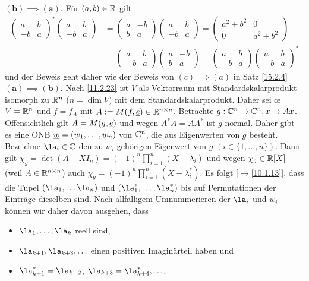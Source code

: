\documentclass[../../main.tex]{subfiles}
\begin{document}
\begin{cproof}
$\boldsymbol{(b)\implies (a)}$. Für $(a,b)\in \mathbb R$ gilt
\begin{align*}
\begin{pmatrix*}a&b\\-b&a\end{pmatrix*}^*\begin{pmatrix*}a&b\\-b&a\end{pmatrix*}&=\begin{pmatrix*}a&-b\\b&a\end{pmatrix*}\begin{pmatrix*}a&b\\-b&a\end{pmatrix*}=\begin{pmatrix*}a^2+b^2&0\\0&a^2+b^2\end{pmatrix*}\\
&=\begin{pmatrix*}a&b\\-b&a\end{pmatrix*}\begin{pmatrix*}a&-b\\b&a\end{pmatrix*}=\begin{pmatrix*}a&b\\-b&a\end{pmatrix*}\begin{pmatrix*}a&b\\-b&a\end{pmatrix*}^*
\end{align*}
und der Beweis geht daher wie der Beweis von $(c)\implies (a)$ in Satz \ref{15.2.4}\\
		
$\boldsymbol{(a)\implies (b)}$. Nach \ref{11.2.23} ist $V$ als Vektorraum mit Standardskalarprodukt isomorph zu $\mathbb R^n$ ($n=\dim V)$ mit dem Standardskalarprodukt. Daher sei \oe $V=\mathbb R^n$ und $f=f_A$ mit $A:=M(f,{\underline e})\in \mathbb R^{n\times n}$. Betrachte $g: \mathbb C^n\to \mathbb C^n,  x\mapsto Ax$. Offensichtlich gilt $A=M(g,{\underline e})$ und wegen $A^*A=AA^*$ ist $g$ normal. Daher gibt es eine ONB ${\underline w}=(w_1,\ldots ,w_n)$ von $\mathbb C^n$, die aus Eigenwerten von $g$ besteht. Bezeichne $\la_i\in \C$ den zu $w_i$ gehörigen Eigenwert von $g$ $(i\in\{1,\ldots ,n\})$. Dann gilt $\chi_g=\det(A-XI_n)=(-1)^n\prod_{i=1}^n(X-\lambda_i)$ und wegen $\chi_g\in \mathbb R[X]$ (weil $A\in \mathbb R^{n\times n}$) auch $\chi_g=(-1)^n\prod_{i=1}^n(X-\lambda_i^*)$. Es folgt [$\to$\ref{10.1.13}], dass die Tupel $(\la_1,\ldots \la_n)$ und $(\la_1^*,\ldots ,\la_n^*)$ bis auf Permutationen der Einträge dieselben sind. Nach allfälligem Umnummerieren der $\la_i$ und $w_i$ können wir daher davon ausgehen, dass
\begin{itemize}
\item $\la_1,\ldots ,\la_k$ reell sind,
\item $\la_{k+1},\la_{k+3},\ldots $ einen positiven Imaginärteil haben und
\item $\la_{k+1}^*=\la_{k+2}$, $\la_{k+3}=\la_{k+4}^*,\ldots $.
\end{itemize}
		

\end{cproof}
\end{document}
